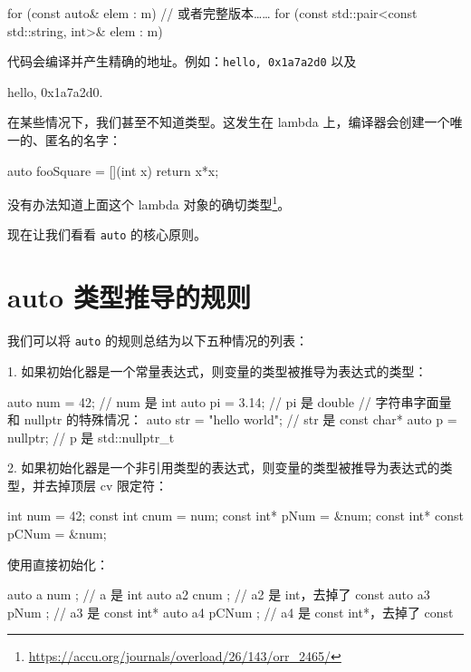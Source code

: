 \begin{codebox}[cpp]
for (const auto& elem : m)
// 或者完整版本……
for (const std::pair<const std::string, int>& elem : m)
\end{codebox}

代码会编译并产生精确的地址。例如：\texttt{hello, 0x1a7a2d0} 以及

\begin{codebox}[cpp]
hello, 0x1a7a2d0.
\end{codebox}

在某些情况下，我们甚至不知道类型。这发生在 lambda 上，编译器会创建一个唯一的、匿名的名字：

\begin{codebox}[cpp]
auto fooSquare = [](int x) { return x*x; }
\end{codebox}

没有办法知道上面这个 lambda 对象的确切类型\footnote{\url{https://accu.org/journals/overload/26/143/orr_2465/}}。

现在让我们看看 \texttt{auto} 的核心原则。

\section{auto 类型推导的规则}

我们可以将 \texttt{auto} 的规则总结为以下五种情况的列表：

1. 如果初始化器是一个常量表达式，则变量的类型被推导为表达式的类型：

\begin{codebox}[cpp]
auto num = 42;
// num 是 int
auto pi = 3.14;
// pi 是 double
// 字符串字面量和 nullptr 的特殊情况：
auto str = "hello world";
// str 是 const char*
auto p = nullptr;
// p 是 std::nullptr_t
\end{codebox}

2. 如果初始化器是一个非引用类型的表达式，则变量的类型被推导为表达式的类型，并去掉顶层 cv 限定符：

\begin{codebox}[cpp]
int num = 42;
const int cnum = num;
const int* pNum = &num;
const int* const pCNum = &num;
\end{codebox}

使用直接初始化：

\begin{codebox}[cpp]
auto a { num };
// a 是 int
auto a2 { cnum };
// a2 是 int，去掉了 const
auto a3 { pNum };
// a3 是 const int*
auto a4 { pCNum };
// a4 是 const int*，去掉了 const
\end{codebox}

